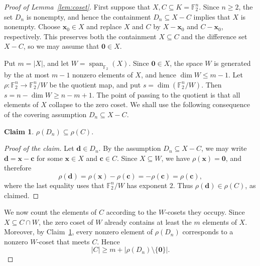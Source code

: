 \documentclass[11pt]{article}
\newtheorem{claim}[theorem]{Claim}
\theoremstyle{definition}
\newenvironment{poc}{\begin{proof}[Proof of the claim]\renewcommand*{\qedsymbol}{$\blacksquare$}}{\end{proof}}
\begin{document}
\begin{proof}[Proof of Lemma~\ref{lem:coset}]
First suppose that \(X,C\subseteq K=\mathbb{F}_2^n\). Since \(n\ge 2\), the set \(D_n\) is nonempty, and hence the containment \(D_n\subseteq X-C\) implies that \(X\) is nonempty. Choose \(\boldsymbol{x}_0\in X\) and replace \(X\) and \(C\) by \(X-\boldsymbol{x}_0\) and \(C-\boldsymbol{x}_0\), respectively. This preserves both the containment \(X\subseteq C\) and the difference set \(X-C\), so we may assume that \(\boldsymbol{0}\in X\).

Put \(m=|X|\), and let
\(
    W=\operatorname{span}_{\mathbb{F}_2}(X).
\)
Since \(\boldsymbol{0}\in X\), the space \(W\) is generated by the at most \(m-1\) nonzero elements of \(X\), and hence
\(
    \dim W\le m-1.
\)
Let
\(
    \rho:\mathbb{F}_2^n\to \mathbb{F}_2^n/W
\)
be the quotient map, and put \(s=\dim(\mathbb{F}_2^n/W)\). Then
\(
    s=n-\dim W\ge n-m+1.
\)
The point of passing to the quotient is that all elements of \(X\) collapse to the zero coset.  We shall use the following consequence of the covering assumption \(D_n\subseteq X-C\).
\begin{claim}\label{claim:containmentRho}
    \(
        \rho(D_n)\subseteq \rho(C).
    \)
\end{claim}
\begin{poc}
    Let \(\boldsymbol{d}\in D_n\).  By the assumption \(D_n\subseteq X-C\), we may write
    \(
        \boldsymbol{d}=\boldsymbol{x}-\boldsymbol{c}
    \)
    for some \(\boldsymbol{x}\in X\) and \(\boldsymbol{c}\in C\).  Since \(X\subseteq W\), we have \(\rho(\boldsymbol{x})=\boldsymbol{0}\), and therefore
    \[
        \rho(\boldsymbol{d})
        =
        \rho(\boldsymbol{x})-\rho(\boldsymbol{c})
        =
        -\rho(\boldsymbol{c})
        =
        \rho(\boldsymbol{c}),
    \]
    where the last equality uses that \(\mathbb{F}_2^n/W\) has exponent \(2\).  Thus \(\rho(\boldsymbol{d})\in \rho(C)\), as claimed.
\end{poc}

We now count the elements of \(C\) according to the \(W\)-cosets they occupy.  Since \(X\subseteq C\cap W\), the zero coset of \(W\) already contains at least the \(m\) elements of \(X\).  Moreover, by Claim~\ref{claim:containmentRho}, every nonzero element of \(\rho(D_n)\) corresponds to a nonzero \(W\)-coset that meets \(C\).  Hence
\[
    |C|\ge m+|\rho(D_n)\setminus\{\boldsymbol{0}\}|.
\]


\end{proof}
\end{document}
